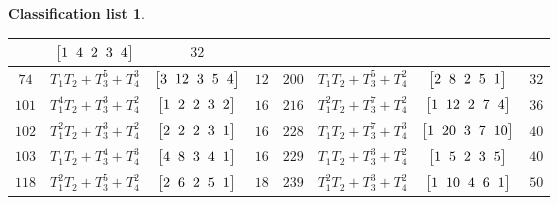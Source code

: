 \documentclass[pdftex]{sigma}%
\theoremstyle{definition}
\newtheorem{class-list}[thm]{Classification list}
\numberwithin{equation}{section}
\begin{document}
\begin{class-list}
\begin{table}[t!]
\begin{tabu}{c|c|c|c||c|c|c|c}
&$\arraycolsep=1mm\begin{bmatrix}{1} & {4} & {2} & {3} & {4}\end{bmatrix}$&${32}$
\\
\hline
${74}$&${T_{1}T_{2}+T_{3}^{5}+T_{4}^{3}}$
&$\arraycolsep=1mm\begin{bmatrix}{3} & {12} & {3} & {5} & {4}\end{bmatrix}$&${12}$
&${200}$&${T_{1}T_{2}+T_{3}^{5}+T_{4}^{2}}$
&$\arraycolsep=1mm\begin{bmatrix}{2} & {8} & {2} & {5} & {1}\end{bmatrix}$&${32}$
\\
\hline
${101}$&${T_{1}^{4}T_{2}+T_{3}^{3}+T_{4}^{2}}$
&$\arraycolsep=1mm\begin{bmatrix}{1} & {2} & {2} & {3} & {2}\end{bmatrix}$&${16}$
&${216}$&${T_{1}^{2}T_{2}+T_{3}^{7}+T_{4}^{2}}$
&$\arraycolsep=1mm\begin{bmatrix}{1} & {12} & {2} & {7} & {4}\end{bmatrix}$&${36}$
\\
\hline
${102}$&${T_{1}^{2}T_{2}+T_{3}^{3}+T_{4}^{2}}$
&$\arraycolsep=1mm\begin{bmatrix}{2} & {2} & {2} & {3} & {1}\end{bmatrix}$&${16}$
&${228}$&${T_{1}T_{2}+T_{3}^{7}+T_{4}^{3}}$
&$\arraycolsep=1mm\begin{bmatrix}{1} & {20} & {3} & {7} & {10}\end{bmatrix}$&${40}$
\\
\hline
${103}$&${T_{1}T_{2}+T_{3}^{4}+T_{4}^{3}}$
&$\arraycolsep=1mm\begin{bmatrix}{4} & {8} & {3} & {4} & {1}\end{bmatrix}$&${16}$
&${229}$&${T_{1}T_{2}+T_{3}^{3}+T_{4}^{2}}$
&$\arraycolsep=1mm\begin{bmatrix}{1} & {5} & {2} & {3} & {5}\end{bmatrix}$&${40}$
\\
\hline
${118}$&${T_{1}^{2}T_{2}+T_{3}^{5}+T_{4}^{2}}$
&$\arraycolsep=1mm\begin{bmatrix}{2} & {6} & {2} & {5} & {1}\end{bmatrix}$&${18}$
&${239}$&${T_{1}^{2}T_{2}+T_{3}^{3}+T_{4}^{2}}$
&$\arraycolsep=1mm\begin{bmatrix}{1} & {10} & {4} & {6} & {1}\end{bmatrix}$&${50}$
\\
\hline
\end{tabu}%
\end{table}
\end{class-list}
\end{document}

